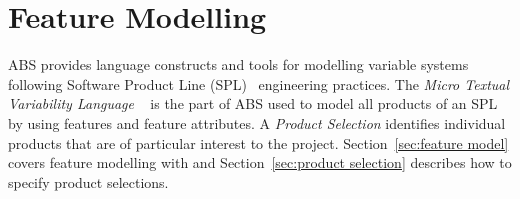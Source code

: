 \chapter{Feature Modelling}
\label{ch:feature modelling}

% 



ABS provides language constructs and tools for modelling variable systems
following Software Product Line (SPL)~\cite{PohlBL05} engineering practices. The
\emph{Micro Textual Variability Language} \muTVL~\cite{clarke-variability-2011}
is the part of ABS used to model all products of an SPL by using features and
feature attributes. A \emph{Product Selection} identifies individual products
that are of particular interest to the project. Section~\ref{sec:feature model}
covers feature modelling with \muTVL and Section~\ref{sec:product selection}
describes how to specify product selections.


